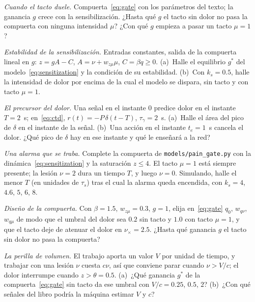 \begin{exercise}[\lvlB]
\label{ex:14:2}
\emph{Cuando el tacto duele.} Compuerta~\eqref{eq:gate} con los parámetros del texto; la ganancia $g$ crece con la sensibilización. ¿Hasta qué $g$ el tacto sin dolor no pasa la compuerta con ninguna intensidad $\mu$? ¿Con qué $g$ empieza a pasar un tacto $\mu=1$?
\end{exercise}

\begin{exercise}[\lvlB]
\label{ex:14:3}
\emph{Estabilidad de la sensibilización.} Entradas constantes, salida de la compuerta lineal en $g$: $z=gA-C$, $A=\nu+w_{z\mu}\mu$, $C=\beta q\ge0$. (a)~Halle el equilibrio $g^*$ del modelo~\eqref{eq:sensitization} y la condición de su estabilidad. (b)~Con $k_s=0.5$, halle la intensidad de dolor por encima de la cual el modelo se dispara, sin tacto y con tacto $\mu=1$.
\end{exercise}

\begin{exercise}[\lvlA]
\label{ex:14:4}
\emph{El precursor del dolor.} Una señal en el instante $0$ predice dolor en el instante $T=2$~s; en~\eqref{eq:ctd}, $r(t)=-P\,\delta(t-T)$, $\tau_\gamma=2$~s. (a)~Halle el área del pico de $\delta$ en el instante de la señal. (b)~Una acción en el instante $t_e=1$~s cancela el dolor. ¿Qué pico de $\delta$ hay en ese instante y qué le enseñará a la red?
\end{exercise}

\begin{exercise}[\lvlB]
\label{ex:14:5}
\emph{Una alarma que se traba.} Complete la compuerta de \texttt{models/\allowbreak pain\_gate.py} con la dinámica~\eqref{eq:sensitization} y la saturación $z\le4$. El tacto $\mu=1$ está siempre presente; la lesión $\nu=2$ dura un tiempo $T$, y luego $\nu=0$. Simulando, halle el menor $T$ (en unidades de $\tau_s$) tras el cual la alarma queda encendida, con $k_s=4$, $4.6$, $5$, $6$, $8$.
\end{exercise}

\begin{exercise}[\lvlB]
\label{ex:14:6}
\emph{Diseño de la compuerta.} Con $\beta=1.5$, $w_{z\mu}=0.3$, $g=1$, elija en~\eqref{eq:gate} $q_0$, $w_{q\nu}$, $w_{q\mu}$ de modo que el umbral del dolor sea $0.2$ sin tacto y $1.0$ con tacto $\mu=1$, y que el tacto deje de atenuar el dolor en $\nu_\times=2.5$. ¿Hasta qué ganancia $g$ el tacto sin dolor no pasa la compuerta?
\end{exercise}

\begin{exercise}[\lvlC]
\label{ex:14:7}
\emph{La perilla de volumen.} El trabajo aporta un valor $V$ por unidad de tiempo, y trabajar con una lesión $\nu$ cuesta $c\nu$, así que conviene parar cuando $\nu>V/c$; el dolor interrumpe cuando $z>\theta=0.5$. (a)~¿Qué ganancia $g^*$ de la compuerta~\eqref{eq:gate} sin tacto da ese umbral con $V/c=0.25$, $0.5$, $2$? (b)~¿Con qué señales del libro podría la máquina estimar $V$ y $c$?
\end{exercise}
